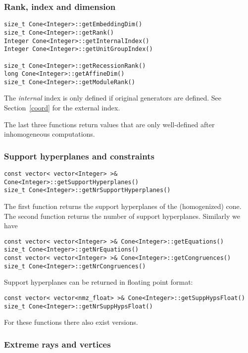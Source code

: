\begin{small}
\subsubsection{Rank, index and dimension}

\begin{Verbatim}
size_t Cone<Integer>::getEmbeddingDim()
size_t Cone<Integer>::getRank()
Integer Cone<Integer>::getInternalIndex()
Integer Cone<Integer>::getUnitGroupIndex()

size_t Cone<Integer>::getRecessionRank()
long Cone<Integer>::getAffineDim()
size_t Cone<Integer>::getModuleRank()
\end{Verbatim}

The \emph{internal} index is only defined if original generators are defined. See Section~\ref{coord} for the external index.

The last three functions return values that are only well-defined after inhomogeneous computations.

\subsubsection{Support hyperplanes and constraints}\label{SHC}

\begin{Verbatim}
const vector< vector<Integer> >& Cone<Integer>::getSupportHyperplanes()
size_t Cone<Integer>::getNrSupportHyperplanes()
\end{Verbatim}

The first function returns the support hyperplanes of the (homogenized) cone.
The second function returns the number of support hyperplanes. Similarly we have

\begin{Verbatim}
const vector< vector<Integer> >& Cone<Integer>::getEquations()
size_t Cone<Integer>::getNrEquations()
const vector< vector<Integer> >& Cone<Integer>::getCongruences()
size_t Cone<Integer>::getNrCongruences()
\end{Verbatim}

Support hyperplanes can be returned in floating point format:
\begin{Verbatim}
const vector< vector<nmz_float> >& Cone<Integer>::getSuppHypsFloat()
size_t Cone<Integer>::getNrSuppHypsFloat()
\end{Verbatim}

For these functions there also exist versions.

\subsubsection{Extreme rays and vertices}


\end{small}

